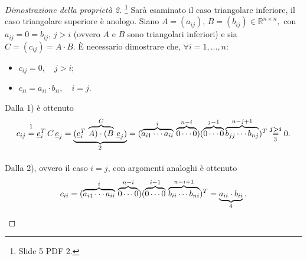 \begin{proof}[Dimostrazione della proprietà 2]
    \footnote{Slide 5 PDF 2.}
    Sarà esaminato il caso triangolare inferiore, il caso triangolare superiore è anologo. Siano $A=(a_{ij}),\, B=(b_{ij})\in\mathbb R^{n\times n},$ con $a_{ij}=0=b_{ij},\, j>i$ (ovvero $A$ e $B$ sono triangolari inferiori) e sia $C=(c_{ij})=A\cdot B.$ È necessario dimostrare che, $\forall i=1,\hdots, n$:
    \begin{itemize}
        \item[1)] $c_{ij}=0,\quad j>i;$
        \item[2)] $c_{ii}=a_{ii}\cdot b_{ii},\quad i=j$.
    \end{itemize}
    Dalla 1) è ottenuto
    \begin{equation*}
        c_{ij}\overset{\footnotemark}{=}\uline e_i^T\,C\,\uline e_j=\underbrace{(\uline e_i^T\, \overbrace{A)\cdot(B}^{C}\,\uline e_j)}_{\footnotemark}=(\overbrace{a_{i1}\cdots a_{ii}}^{i}\, \overbrace{0\cdots 0}^{n-i})(\overbrace{0\cdots 0}^{j-1}\overbrace{b_{jj}\cdots b_{nj}}^{n-j+1})^T\underset{\footnotemark}{\overset{\boldsymbol{j>i}}{=}}0.
    \end{equation*}
    
    \addtocounter{footnote}{-2}
    
    
    
    \noindent Dalla 2), ovvero il caso $i=j$, con argomenti analoghi è ottenuto
    \begin{equation*}
        c_{ii}=(\overbrace{a_{i1}\cdots a_{ii}}^{i}\,\overbrace{0\cdots 0}^{n-i})(\overbrace{0\cdots 0}^{i-1}\,\overbrace{b_{ii}\cdots b_{ni}}^{n-i+1})^T=\underbrace{a_{ii}\cdot b_{ii}}_{\footnotemark}.
    \end{equation*}
\end{proof}


